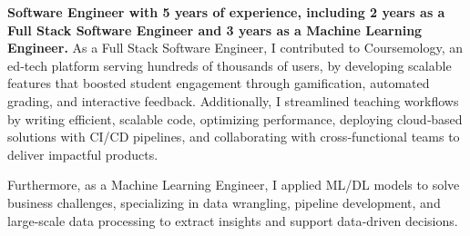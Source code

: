 

\begin{cvparagraph}

\textbf{Software Engineer with 5 years of experience, including 2 years as a Full Stack Software Engineer and 3 years as a Machine Learning Engineer.} As a Full Stack Software Engineer, I contributed to Coursemology, an ed‑tech platform serving hundreds of thousands of users, by developing scalable features that boosted student engagement through gamification, automated grading, and interactive feedback. Additionally, I streamlined teaching workflows by writing efficient, scalable code, optimizing performance, deploying cloud‑based solutions with CI/CD pipelines, and collaborating with cross‑functional teams to deliver impactful products.

Furthermore, as a Machine Learning Engineer, I applied ML/DL models to solve business challenges, specializing in data wrangling, pipeline development, and large‑scale data processing to extract insights and support data‑driven decisions.
\end{cvparagraph}
